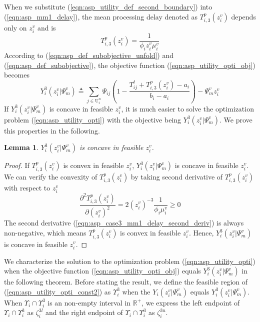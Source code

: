 \documentclass[conference]{IEEEtran}
\newtheorem{lemma}{Lemma}
\begin{document}
When we substitute (\ref{eqn:asp_utility_def_second_boundary}) into (\ref{eqn:asp_mm1_delay}), the mean processing delay denoted as $T_{i,3}^p(z_i^v)$ depends only on $z_i^v$ and is 
\begin{equation}
T_{i,3}^p(z_i^v) = \frac{1}{\phi_i z_i^v \mu_i^v}
\end{equation}
According to (\ref{eqn:asp_def_subobjective_unfold}) and (\ref{eqn:asp_def_subobjective}), the objective function (\ref{eqn:asp_utility_opti_obj}) becomes
\begin{equation}
Y_i^3(z_i^v|\Psi_m^v) \triangleq \sum_{j \in \mathrm{U}_i^n}\Psi_{ij}(1-\frac{T_{ij}^t + T_{i,3}^p(z_i^v)-a_i}{b_i-a_i}) - \Psi_m^vz_i^v
\end{equation}
If $Y_i^3(z_i^v|\Psi_m^v)$ is concave in feasible $z_i^v$, it is much easier to solve the optimization problem (\ref{eqn:asp_utility_opti}) with the objective being $Y_i^3(z_i^v|\Psi_m^v)$. We prove this properties in the following. 
\begin{lemma} \label{lemma:asp_case3_utility_concave}
$Y_i^3(z_i^v|\Psi_m^v)$ is concave in feasible $z_i^v$.
\end{lemma}
\begin{proof}
If $T_{i,3}^p(z_i^v)$ is convex in feasible $z_i^v$, $Y_i^3(z_i^v|\Psi_m^v)$ is concave in feasible $z_i^v$. We can verify the convexity of $T_{i,3}^p(z_i^v)$ by taking second derivative of $T_{i,3}^p(z_i^v)$ with respect to $z_i^v$
\begin{equation} \label{eqn:asp_case3_mm1_delay_second_deriv}
\frac{\partial^2 T_{i,3}^p(z_i^v)}{\partial (z_i^v)^2} = 2(z_i^v)^{-3}\frac{1}{\phi_i \mu_i^v} \geq 0 
\end{equation}
The second derivative (\ref{eqn:asp_case3_mm1_delay_second_deriv}) is always non-negative, which means $T_{i,3}^p(z_i^v)$ is convex in feasible $z_i^v$. Hence, $Y_i^3(z_i^v|\Psi_m^v)$ is concave in feasible $z_i^v$.
\end{proof}
We characterize the solution to the optimization problem (\ref{eqn:asp_utility_opti}) when the objective function (\ref{eqn:asp_utility_opti_obj}) equals $Y_i^3(z_i^v|\Psi_m^v)$ in the following theorem. Before stating the result, we define the feasible region of (\ref{eqn:asp_utility_opti_const2}) as $\Upsilon_i^3$ when the $Y_i(z_i^v|\Psi_m^v)$ equals $Y_i^3(z_i^v|\Psi_m^v)$. When $\Upsilon_i \cap \Upsilon_i^3$ is an non-empty interval in $\mathbb{R}^+$, we express the left endpoint of $\Upsilon_i \cap \Upsilon_i^3$ as $\zeta_i^{3l}$ and the right endpoint of $\Upsilon_i \cap \Upsilon_i^3$ as $\zeta_i^{3u}$.
\end{document}
